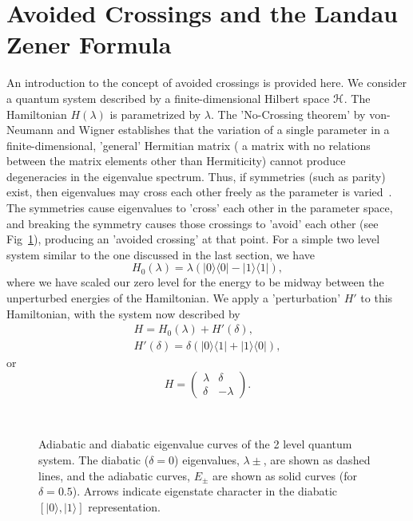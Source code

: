 \section{Avoided Crossings and the Landau Zener Formula}
\label{chapter-intro:section:avcross}
An introduction to the concept of avoided crossings is provided here. We consider a quantum system described by a finite-dimensional Hilbert space $\cal H$. The Hamiltonian $H(\lambda)$ is parametrized by $\lambda$. The  'No-Crossing theorem' by von-Neumann and Wigner establishes that the variation of a single parameter in a finite-dimensional, 'general' Hermitian matrix ( a matrix with no relations between the matrix elements other than Hermiticity) cannot produce degeneracies in the eigenvalue spectrum. Thus, if symmetries (such as parity) exist, then eigenvalues may cross each other freely as the parameter is varied~\cite{vonneumann:wigner}. The symmetries cause eigenvalues to 'cross' each other in the parameter space, and breaking the symmetry causes those crossings to 'avoid' each other (see Fig~\ref{fig:2lvl:avcross:chapter-intro}), producing an 'avoided crossing' at that point. For a simple two level system similar to the one discussed in the last section, we have
\begin{equation}
H_0(\lambda)= \lambda \left( |0\rangle \langle 0| - |1\rangle \langle 1| \right),
\label{eq:hamilt:avcross:chapter-intro}
\end{equation}
where we have scaled our zero level for the energy to be midway between the unperturbed energies of the Hamiltonian. We apply a 'perturbation' $H'$ to this Hamiltonian, with the system now described by 
\begin{eqnarray}
H=H_0(\lambda)+H'(\delta), \nonumber \\
H'(\delta) = \delta \left( |0\rangle \langle 1| + |1\rangle \langle 0| \right),
\end{eqnarray}
or
\begin{equation}
H = \left( \begin{array}{cc}
            \lambda & \delta\\
	    \delta & -\lambda
           \end{array}\right).
\label{eq:fullhamilt:avcross:chapter-intro}
\end{equation}
\begin{figure}
\ 
\caption{Adiabatic and diabatic eigenvalue curves of the 2 level quantum system. The diabatic ($\delta=0$) eigenvalues, $\lambda\pm$, are shown as dashed lines, and the adiabatic curves, $E_\pm$ are shown as solid curves (for $\delta=0.5$). Arrows indicate eigenstate character in the diabatic $\left[|0\rangle, |1\rangle \right]$ representation.}
\label{fig:2lvl:avcross:chapter-intro}
\end{figure}
